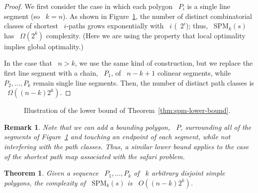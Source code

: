 \documentclass[11pt]{article}
\newtheorem{theorem}{Theorem}
\newtheorem*{remark}{Remark}
\begin{document}
\begin{proof}
We first consider the case in which each polygon ~\(P_i\) is a single line segment (so ~\(k = n\)).
As shown in Figure~\ref{fig:lowerbound}, the number of distinct combinatorial classes of shortest ~\(i\)-paths grows exponentially with ~\(i\) (~\(2^i\)); thus, ~\(\text{SPM}_k(s)\) has ~\(\Omega(2^k)\) complexity.
(Here we are using the property that local optimality implies global optimality.)

In the case that ~\(n > k\), we use the same kind of construction, but we replace the first line segment with a chain, ~\(P_1\), of ~\(n-k+1\) colinear segments, while ~\(P_2, \ldots, P_k\) remain single line segments.
Then, the number of distinct path classes is ~\(\Omega((n-k)2^k)\).
\end{proof}

\begin{figure}[H]
	\centering
	\caption{Illustration of the lower bound of Theorem~\ref{thm:spm-lower-bound}.}
	\label{fig:lowerbound}
\end{figure}

\begin{remark}
Note that we can add a bounding polygon, ~\(P\), surrounding all of the segments of Figure~\ref{fig:lowerbound} and touching an endpoint of each segment, while not interfering with the path classes.
Thus, a similar lower bound applies to the case of the shortest path map associated with the safari problem.
\end{remark}

\begin{theorem}
Given a sequence ~\(P_1, \ldots, P_k\) of ~\(k\) arbitrary disjoint simple polygons, the complexity of ~\(\text{SPM}_k(s)\) is ~\(O((n-k)2^k)\).
\end{theorem}
\end{document}
